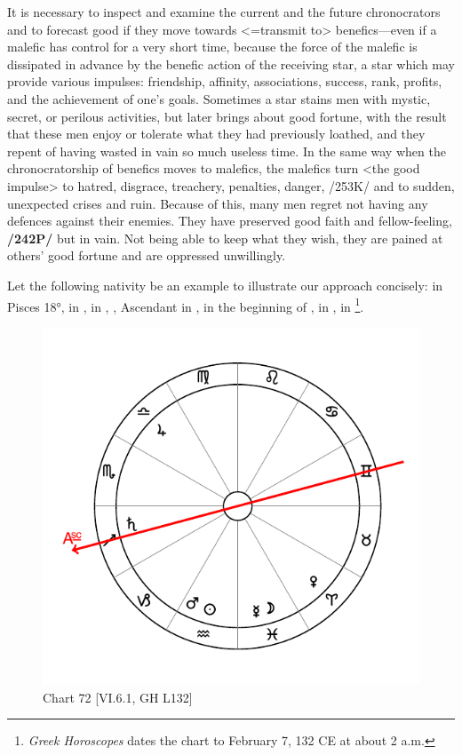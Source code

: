 It is necessary to inspect and examine the current and the future chronocrators and to forecast good if they move towards <=transmit to> benefics—even if a malefic has control for a very short time, because the force of the malefic is dissipated in advance by the benefic action of the receiving star, a star which may provide various impulses: friendship, affinity, associations, success, rank, profits, and the achievement of one’s goals. Sometimes a star stains men with mystic, secret, or perilous activities, but later brings about good fortune, with the result that these men enjoy or tolerate what they had previously loathed, and they repent of having wasted in vain so much useless time. In the same way when the chronocratorship of benefics moves to malefics, the malefics turn <the good impulse> to hatred, disgrace, treachery, penalties, danger, /253K/ and to sudden, unexpected crises and ruin. Because of this, many men regret not having any defences against their enemies. They have preserved good faith and fellow-feeling, \textbf{/242P/} but in vain. Not being able to keep what they wish, they are pained at others’ good fortune and are oppressed unwillingly.

\newpage
Let the following nativity be an example to illustrate our approach concisely: \Moon\xspace in Pisces 18°, \Venus\xspace in \Aries, \Jupiter\xspace in \Libra, \Saturn, Ascendant in \Sagittarius, \Mars\xspace in the beginning of \Aquarius, \Sun\xspace in \Aquarius, \Mercury\xspace in \Pisces\footnote{\textit{Greek Horoscopes} dates the chart to February 7, 132 CE at about 2 a.m.}. 

\begin{figure}
\centering
\vspace{-20pt}
\includegraphics[width=.68\textwidth]{charts/6_6_1}
\caption{Chart 72 [VI.6.1, GH L132]}
\label{fig:chart72}
\end{figure}

